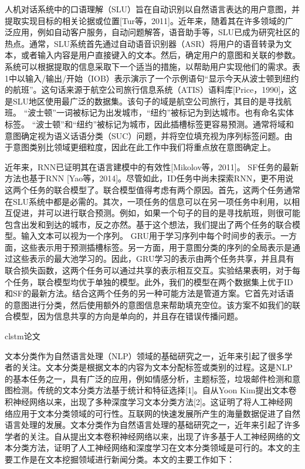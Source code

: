人机对话系统中的口语理解（SLU）旨在自动识别以自然语言表达的用户意图，并提取实现目标的相关论据或位置[Tur等，2011]。近年来，随着其在许多领域的广泛应用，例如自动客户服务，自动问题解答，语音助手等，SLU已成为研究社区的热点。通常，SLU系统首先通过自动语音识别器（ASR）将用户的语音转录为文本，或者输入内容是用户直接键入的文本。然后，确定用户的意图和关联的参数。系统可以根据提取的信息采取下一个适当的措施，以帮助用户实现他们的需求。表1中以输入/输出/开始（IOB）表示演示了一个示例语句“显示今天从波士顿到纽约的航班”。这句话来源于航空公司旅行信息系统（ATIS）语料库[Price，1990]，这是SLU地区使用最广泛的数据集。该句子的域是航空公司旅行，其目的是寻找航班。 “波士顿”一词被标记为出发城市，“纽约”被标记为到达城市。也有命名实体标签。 “波士顿”和“纽约”被标记为城市，因此插槽标签更容易预测。通常将域和意图确定视为语义话语分类（SUC）问题，并将空位填充视为序列标签问题。由于意图类别比领域更细粒度，因此在此工作中我们将重点放在意图确定上。

近年来，RNN已证明其在语言建模中的有效性[Mikolov等，2011]。 SF任务的最新方法也基于RNN [Yao等，2014]。尽管如此，ID任务中尚未探索RNN，更不用说这两个任务的联合模型了。联合模型值得考虑有两个原因。首先，这两个任务通常在SLU系统中都是必需的。其次，一项任务的信息可以在另一项任务中利用，以相互促进，并可以进行联合预测。例如，如果一个句子的目的是寻找航班，则很可能包含出发和到达的城市，反之亦然。基于这个想法，我们提出了两个任务的联合模型。输入文本可以视为一个序列。 GRU用于学习序列中每个时间步的表示。一方面，这些表示用于预测插槽标签。另一方面，用于意图分类的序列的全局表示是通过这些表示的最大池学习的。因此，GRU学习的表示由两个任务共享，并且具有联合损失函数，这两个任务可以通过共享的表示相互交互。实验结果表明，对于每个任务，联合模型均优于单独的模型。此外，我们的模型在两个数据集上优于ID和SF的最新方法。结合这两个任务的另一种可能方法是管道方案。它首先对话语的意图进行分类，然后使用额外的意图信息来帮助填充空位。该方案不如我们的联合模型，因为信息共享的方向是单向的，并且存在错误传播问题。

clstm论文

文本分类作为自然语言处理（NLP）领域的基础研究之一，近年来引起了很多学者的关注。文本分类是根据文本的内容为文本分配标签或类别的过程。这是NLP的基本任务之一，具有广泛的应用，例如情感分析，主题标签，垃圾邮件检测和意图检测。传统的文本分类方法基于统计和特征选择[1]。自从Yoon Kim提出文本卷积神经网络以来，出现了多种深度学习文本分类方法[2]。这证明了将人工神经网络应用于文本分类领域的可行性。互联网的快速发展所产生的海量数据促进了自然语言处理的发展。文本分类作为自然语言处理的基础研究之一，近年来引起了许多学者的关注。自从提出文本卷积神经网络以来，出现了许多基于人工神经网络的文本分类方法，证明了人工神经网络和深度学习在文本分类领域是可行的。本文的主要工作是在文本挖掘领域进行新闻分类。本文的主要工作如下：

